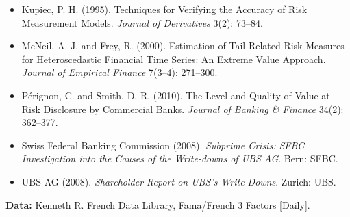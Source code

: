 \begin{itemize}
  \item Kupiec, P. H. (1995). Techniques for Verifying the Accuracy of Risk Measurement Models. \emph{Journal of Derivatives} 3(2): 73--84.
  \item McNeil, A. J. and Frey, R. (2000). Estimation of Tail-Related Risk Measures for Heteroscedastic Financial Time Series: An Extreme Value Approach. \emph{Journal of Empirical Finance} 7(3--4): 271--300.
  \item P\'erignon, C. and Smith, D. R. (2010). The Level and Quality of Value-at-Risk Disclosure by Commercial Banks. \emph{Journal of Banking \& Finance} 34(2): 362--377.
  \item Swiss Federal Banking Commission (2008). \emph{Subprime Crisis: SFBC Investigation into the Causes of the Write-downs of UBS AG}. Bern: SFBC.
  \item UBS AG (2008). \emph{Shareholder Report on UBS's Write-Downs}. Zurich: UBS.
\end{itemize}

\textbf{Data:} Kenneth R. French Data Library, Fama/French 3 Factors [Daily].
